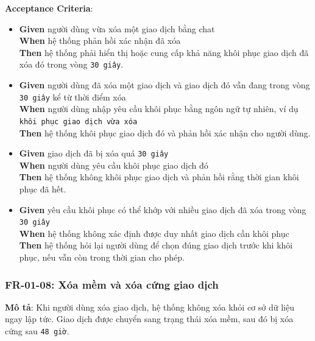 \textbf{Acceptance Criteria}:

\begin{itemize}
\item \textbf{Given} người dùng vừa xóa một giao dịch bằng chat  \\ \hspace*{1.5em}  \textbf{When} hệ thống phản hồi xác nhận đã xóa  \\ \hspace*{1.5em}  \textbf{Then} hệ thống phải hiển thị hoặc cung cấp khả năng khôi phục giao dịch đã xóa đó trong vòng \texttt{30 giây}.
\item \textbf{Given} người dùng đã xóa một giao dịch và giao dịch đó vẫn đang trong vòng \texttt{30 giây} kể từ thời điểm xóa  \\ \hspace*{1.5em}  \textbf{When} người dùng nhập yêu cầu khôi phục bằng ngôn ngữ tự nhiên, ví dụ \texttt{khôi phục giao dịch vừa xóa}  \\ \hspace*{1.5em}  \textbf{Then} hệ thống khôi phục giao dịch đó và phản hồi xác nhận cho người dùng.
\item \textbf{Given} giao dịch đã bị xóa quá \texttt{30 giây}  \\ \hspace*{1.5em}  \textbf{When} người dùng yêu cầu khôi phục giao dịch đó  \\ \hspace*{1.5em}  \textbf{Then} hệ thống không khôi phục giao dịch và phản hồi rằng thời gian khôi phục đã hết.
\item \textbf{Given} yêu cầu khôi phục có thể khớp với nhiều giao dịch đã xóa trong vòng \texttt{30 giây}  \\ \hspace*{1.5em}  \textbf{When} hệ thống không xác định được duy nhất giao dịch cần khôi phục  \\ \hspace*{1.5em}  \textbf{Then} hệ thống hỏi lại người dùng để chọn đúng giao dịch trước khi khôi phục, nếu vẫn còn trong thời gian cho phép.
\end{itemize}
\subsubsection{FR-01-08: Xóa mềm và xóa cứng giao dịch}

\textbf{Mô tả}: Khi người dùng xóa giao dịch, hệ thống không xóa khỏi cơ sở dữ liệu ngay lập tức. Giao dịch được chuyển sang trạng thái xóa mềm, sau đó bị xóa cứng sau \texttt{48 giờ}.



